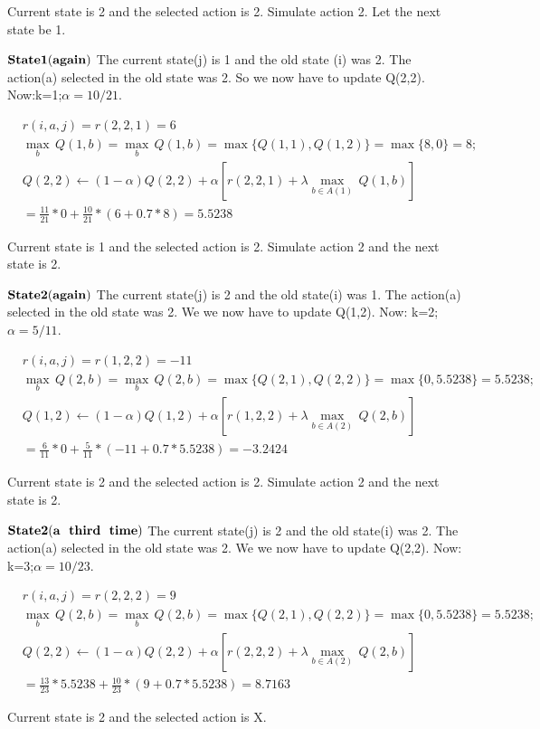 \documentclass[12pt]{article}%
\begin{document}
Current state is 2 and the selected action is 2. Simulate action 2. Let the next state be 1.

$\bf{State 1(again)}$ The current state(j) is 1 and the old state (i) was 2. The action(a) selected in the old state was 2. So we now have to update Q(2,2). Now:k=1;$\alpha=10/21$.

\begin{align}
  & r(i,a,j)=r(2,2,1)=6 \\ 
 & \underset{b}{\mathop{\max }}\,Q(1,b)=\underset{b}{\mathop{\max }}\,Q(1,b)=\max \{Q(1,1),Q(1,2)\}=\max \{8,0\}=8; \\ 
 & Q(2,2)\leftarrow (1-\alpha )Q(2,2)+\alpha [r(2,2,1)+\lambda \underset{b\in A(1)}{\mathop{\max }}\,Q(1,b)] \\ 
 & =\frac{11}{21}*0+\frac{10}{21}*(6+0.7*8)=5.5238 
\end{align}

Current state is 1 and the selected action is 2. Simulate action 2 and the next state is 2.

$\bf{State 2(again)}$  The current state(j) is 2 and the old state(i) was 1. The action(a) selected in the old state was 2. We we now have to update Q(1,2). Now: k=2;$\alpha=5/11$.

\begin{align}
  & r(i,a,j)=r(1,2,2)=-11 \\ 
 & \underset{b}{\mathop{\max }}\,Q(2,b)=\underset{b}{\mathop{\max }}\,Q(2,b)=\max \{Q(2,1),Q(2,2)\}=\max \{0,5.5238\}=5.5238; \\ 
 & Q(1,2)\leftarrow (1-\alpha )Q(1,2)+\alpha [r(1,2,2)+\lambda \underset{b\in A(2)}{\mathop{\max }}\,Q(2,b)] \\ 
 & =\frac{6}{11}*0+\frac{5}{11}*(-11+0.7*5.5238)=-3.2424 
\end{align}

Current state is 2 and the selected action is 2. Simulate action 2 and the next state is 2.

$\bf{State 2(a\ \ third \ \ time)}$  The current state(j) is 2 and the old state(i) was 2. The action(a) selected in the old state was 2. We we now have to update Q(2,2). Now: k=3;$\alpha=10/23$.

\begin{align}
  & r(i,a,j)=r(2,2,2)=9 \\ 
 & \underset{b}{\mathop{\max }}\,Q(2,b)=\underset{b}{\mathop{\max }}\,Q(2,b)=\max \{Q(2,1),Q(2,2)\}=\max \{0,5.5238\}=5.5238; \\ 
 & Q(2,2)\leftarrow (1-\alpha )Q(2,2)+\alpha [r(2,2,2)+\lambda \underset{b\in A(2)}{\mathop{\max }}\,Q(2,b)] \\ 
 & =\frac{13}{23}*5.5238+\frac{10}{23}*(9+0.7*5.5238)=8.7163 
\end{align}

Current state is 2 and the selected action is X. 


























 
  
  
  
  
  
  
\end{document}
